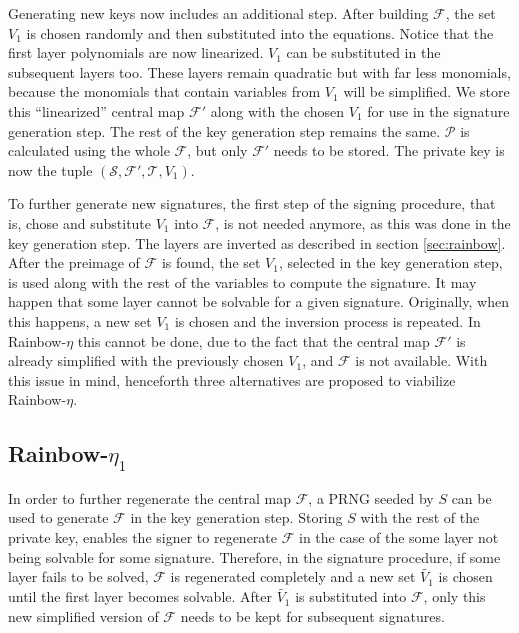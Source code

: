 \documentclass{ufsctex/ufsctex}
\begin{document}
Generating new keys now includes an additional step. After building
$\mathcal{F}$, the set $V_1$ is chosen randomly and then substituted into the
equations. Notice that the first layer polynomials are now linearized. $V_1$
can be substituted in the subsequent layers too. These layers remain quadratic
but with far less monomials, because the monomials that contain variables from
$V_1$ will be simplified. We store this ``linearized'' central map
$\mathcal{F'}$ along with the chosen $V_1$ for use in the signature generation
step. The rest of the key generation step remains the same. $\mathcal{P}$ is
calculated using the whole $\mathcal{F}$, but only $\mathcal{F'}$ needs to be
stored. The private key is now the tuple $(\mathcal{S}, \mathcal{F'},
\mathcal{T}, V_1)$.

To further generate new signatures, the first step of the signing procedure,
that is, chose and substitute $V_1$ into $\mathcal{F}$, is not needed anymore,
as this was done in the key generation step. The layers are inverted as
described in section \ref{sec:rainbow}. After the preimage of $\mathcal{F}$ is
found, the set $V_1$, selected in the key generation step, is used along with
the rest of the variables to compute the signature. It may happen that some
layer cannot be solvable for a given signature. Originally, when this happens,
a new set $V_1$ is chosen and the inversion process is repeated. In
Rainbow-$\eta$ this cannot be done, due to the fact that the central map
$\mathcal{F'}$ is already simplified with the previously chosen $V_1$, and
$\mathcal{F}$ is not available. With this issue in mind, henceforth three
alternatives are proposed to viabilize Rainbow-$\eta$.

\subsection{Rainbow-$\eta_1$}

In order to further regenerate the central map $\mathcal{F}$, a
PRNG seeded by $S$ can be used to
generate $\mathcal{F}$ in the key generation step. Storing $S$ with the rest of
the private key, enables the signer to regenerate $\mathcal{F}$ in the case of
the some layer not being solvable for some signature. Therefore, in the
signature procedure, if some layer fails to be solved, $\mathcal{F}$ is
regenerated completely and a new set $\tilde{V_1}$ is chosen until the first
layer becomes solvable. After $\tilde{V_1}$ is substituted into $\mathcal{F}$,
only this new simplified version of $\mathcal{F}$ needs to be kept for
subsequent signatures.
\end{document}
